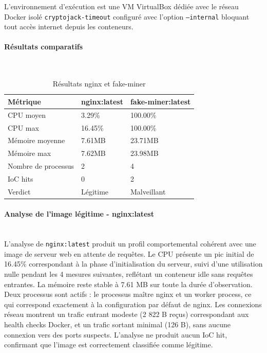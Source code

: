 \noindent L'environnement d'exécution est une VM VirtualBox dédiée avec le réseau Docker isolé \texttt{cryptojack-timeout} configuré avec l'option \texttt{--internal} bloquant tout accès internet depuis les conteneurs.
\paragraph{Résultats comparatifs} \mbox{} \\
\begin{table}[H]
    \centering
    \begin{tabularx}{\textwidth}{|l|l|X|}
        \hline
        \textbf{Métrique} & \textbf{nginx:latest} & \textbf{fake-miner:latest} \\
        \hline
        CPU moyen & 3.29\% & 100.00\% \\
        \hline
        CPU max & 16.45\% & 100.00\% \\
        \hline
        Mémoire moyenne & 7.61MB & 23.71MB \\
        \hline
        Mémoire max & 7.62MB & 23.98MB \\
        \hline
        Nombre de processus & 2 & 4 \\
        \hline
        IoC hits & 0 & 2 \\
        \hline
        Verdict & Légitime & Malveillant \\
        \hline
    \end{tabularx}
    \caption{Résultats nginx et fake-miner}
\end{table}
\newpage
\noindent \paragraph{Analyse de l'image légitime  - nginx:latest} \mbox{} \\
\noindent L'analyse de \texttt{nginx:latest} produit un profil comportemental cohérent avec une image de serveur web en attente de requêtes. Le CPU présente un pic initial de 16.45\% correspondant à la phase d'initialisation du serveur, suivi d'une utilisation nulle pendant les 4 mesures suivantes, reflétant un conteneur idle sans requêtes entrantes. La mémoire reste stable à 7.61 MB sur toute la durée d'observation. \\

\noindent Deux processus sont actifs : le processus maître nginx et un worker process, ce qui correspond exactement à la configuration par défaut de nginx. Les connexions réseau montrent un trafic entrant modeste (2 822 B reçus) correspondant aux health checks Docker, et un trafic sortant minimal (126 B), sans aucune connexion vers des ports suspects. L'analyse ne produit aucun IoC hit, confirmant que l'image est correctement classifiée comme légitime. \\

